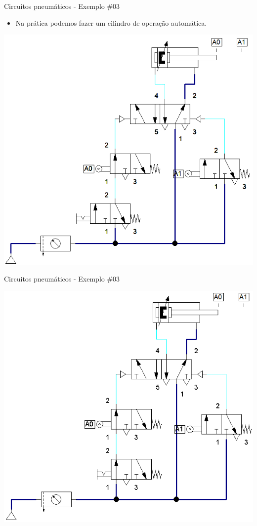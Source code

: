 \begin{frame}{Circuitos pneumáticos - Exemplo \#03}
	\begin{block}{}
		\begin{itemize}
			\item Na prática podemos fazer um cilindro de operação automática.
		\end{itemize}
	\end{block}
	
	\medskip
	
	\centering
	\includegraphics[height=0.7\textheight]{Figuras/Ch14/fig47}
	
\end{frame}


\begin{frame}{Circuitos pneumáticos - Exemplo \#03}
	
	\centering
	\includegraphics[width=0.7\linewidth]{Figuras/Ch14/fig47n2}
	
\end{frame}


